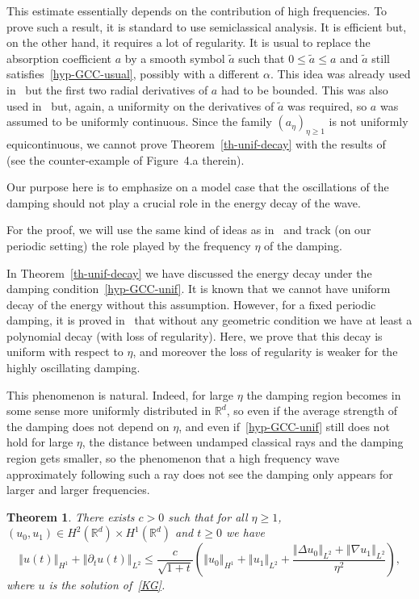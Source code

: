 \documentclass[10pt]{amsart}
\newtheorem{theo}{Theorem}[section]
\theoremstyle{definition}\newtheorem{defi}[theo]{Definition}\newtheorem{rema}[theo]{Remark}\newtheorem{exam}[theo]{Example}\newtheorem{exem}[theo]{Example}\newtheorem{nota}[theo]{Notation}
\newcommand{\nr}[1]{\left\Vert #1\right\Vert}
\renewcommand{\leq}{\leqslant}
\renewcommand{\geq}{\geqslant}
\newcommand{\1}{\mathds 1}
\newcommand{\R}{\mathbb{R}}
\renewcommand{\a}{\alpha}
\newcommand{\D}{\Delta}
\begin{document}
This estimate essentially depends on the contribution of high frequencies. To prove such a result, it is standard to use semiclassical analysis. It is efficient but, on the other hand, it requires a lot of regularity. It is usual to replace the absorption coefficient $a$ by a smooth symbol $\tilde a$ such that $0 \leq \tilde a \leq a$ and $\tilde a$ still satisfies~\eqref{hyp-GCC-usual}, possibly with a different $\a$. This idea was already used in~\cite{royer-mourre} but the first two radial derivatives of $a$ had to be bounded. This was also used in~\cite{BurqJo} but, again, a uniformity on the derivatives of $\tilde a$ was required, so $a$ was assumed to be uniformly continuous. Since the family $(a_\eta)_{\eta \geq 1}$ is not uniformly equicontinuous, we cannot prove Theorem~\ref{th-unif-decay} with the results of~\cite{BurqJo} (see the counter-example of Figure~4.a therein).

Our purpose here is to emphasize on a model case that the oscillations of the damping should not play a crucial role in the energy decay of the wave.

For the proof, we will use the same kind of ideas as in~\cite{BurqJo} and track (on our periodic setting) the role played by the frequency $\eta$ of the damping.%


In Theorem~\ref{th-unif-decay} we have discussed the energy decay under the damping condition~\eqref{hyp-GCC-unif}. It is known that we cannot have uniform decay of the energy without this assumption. However, for a fixed periodic damping, it is proved in~\cite{Wunsch} that without any geometric condition we have at least a polynomial decay (with loss of regularity). Here, we prove that this decay is uniform with respect to $\eta$, and moreover the loss of regularity is weaker for the highly oscillating damping.

This phenomenon is natural. Indeed, for large $\eta$ the damping region becomes in some sense more uniformly distributed in $\R^d$, so even if the average strength of the damping does not depend on $\eta$, and even if~\eqref{hyp-GCC-unif} still does not hold for large $\eta$, the distance between undamped classical rays and the damping region gets smaller, so the phenomenon that a high frequency wave approximately following such a ray does not see the damping only appears for larger and larger frequencies.


\begin{theo}\label{th-no-GCC}
There exists $c > 0$ such that for all $\eta \geq 1$, $(u_0,u_1) \in H^2(\R^d) \times H^1(\R^d)$ and $t \geq 0$ we have
\[
\nr{u(t)}_{H^1} + \nr{\partial_t u(t)}_{L^2} \leq \frac c {\sqrt {1+t}} \left(\nr{u_0}_{H^1} + \nr{u_1}_{L^2} + \frac {\nr{\D u_0}_{L^2} + \nr{\nabla u_1}_{L^2}}{\eta^2} \right),
\]
where $u$ is the solution of~\eqref{KG}.
\end{theo}
\end{document}
